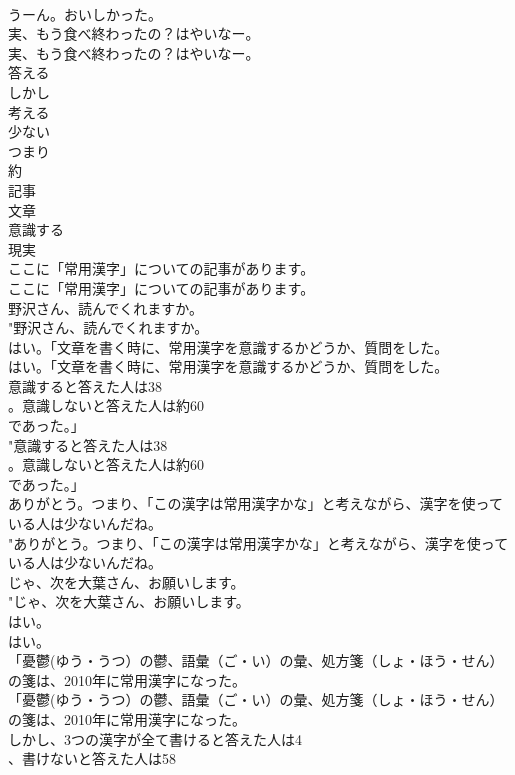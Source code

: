 \documentclass[8pt]{extreport}
\begin{document}
\begin{CJK}{UTF8}{min}
\\	うーん。おいしかった。 
\\	実、もう食べ終わったの？はやいなー。	
\\	実、もう食べ終わったの？はやいなー。 
\\	答える
\\	しかし
\\	考える
\\	少ない
\\	つまり
\\	約
\\	記事
\\	文章
\\	意識する
\\	現実
\\	ここに「常用漢字」についての記事があります。	
\\	ここに「常用漢字」についての記事があります。 
\\	野沢さん、読んでくれますか。	
\\	"野沢さん、読んでくれますか。 
\\	はい。「文章を書く時に、常用漢字を意識するかどうか、質問をした。	
\\	はい。「文章を書く時に、常用漢字を意識するかどうか、質問をした。 
\\	意識すると答えた人は38
\\	。意識しないと答えた人は約60
\\	であった。」	
\\	"意識すると答えた人は38
\\	。意識しないと答えた人は約60
\\	であった。」 
\\	ありがとう。つまり、「この漢字は常用漢字かな」と考えながら、漢字を使っている人は少ないんだね。	
\\	"ありがとう。つまり、「この漢字は常用漢字かな」と考えながら、漢字を使っている人は少ないんだね。 
\\	じゃ、次を大葉さん、お願いします。	
\\	"じゃ、次を大葉さん、お願いします。 
\\	はい。	
\\	はい。 
\\	「憂鬱(ゆう・うつ）の鬱、語彙（ご・い）の彙、処方箋（しょ・ほう・せん）の箋は、2010年に常用漢字になった。	
\\	「憂鬱(ゆう・うつ）の鬱、語彙（ご・い）の彙、処方箋（しょ・ほう・せん）の箋は、2010年に常用漢字になった。 
\\	しかし、3つの漢字が全て書けると答えた人は4
\\	、書けないと答えた人は58

\end{CJK}
\end{document}
